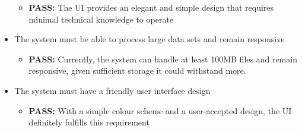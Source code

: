 \documentclass[12pt]{article}
\begin{document}
\begin{itemize}
      \begin{itemize}
        \item \textbf{PASS:} The UI provides an elegant and simple design that requires minimal technical knowledge to operate
      \end{itemize}
      \item The system must be able to process large data sets and remain responsive
      \begin{itemize}
        \item \textbf{PASS:} Currently, the system can handle at least 100MB files and remain responsive, given sufficient storage it could withstand more.
      \end{itemize}
      \item The system must have a friendly user interface design
      \begin{itemize}
        \item \textbf{PASS:} With a simple colour scheme and a user-accepted design, the UI definitely fulfills this requirement
      \end{itemize}
\end{itemize}
\end{document}
